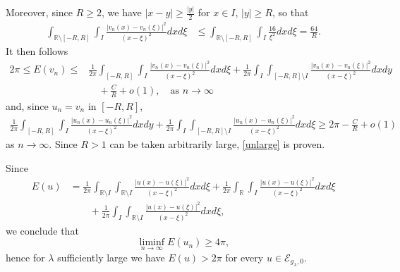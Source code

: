 \documentclass[12pt, a4paper]{article}
\newcommand{\M}[1]{\mathcal{#1}}
\newcommand{\R}{\mathbb{R}}
\newcommand{\blu}[1]{{\color{blue}#1}}
\renewcommand{\(}{\left(}
\renewcommand{\)}{\right)}
\begin{document}
Moreover, since $R\ge 2$, we have $|x-y|\ge \frac{|y|}{2}$ for $x\in I$, $|y|\ge R$, so that
\[\begin{split}
\int_{\R\setminus[-R,R]}\int_{I}\frac{|v_n(x)-v_n(\xi)|^2}{(x-\xi)^2}dxd\xi&\le
\int_{\R\setminus[-R,R]}\int_{I}\frac{16}{\xi^2}dxd\xi= \frac{64}{R}.
\end{split}\]
It then follows
\begin{align*}2\pi \le E(v_n)\le & \frac{1}{2\pi}\int_{[-R,R]}\int_{I}\frac{|v_n(x)-v_n(\xi)|^2}{(x-\xi)^2}dxd\xi+\frac{1}{2\pi}\int_{I}\int_{[-R,R]\setminus I}\frac{|v_n(x)-v_n(\xi)|^2}{(x-\xi)^2}dxdy\\&\quad +\frac{C}{R}+o(1),\quad \text{as }n\to\infty\end{align*}
and, since $u_n=v_n$ in $[-R,R]$,
\[
\begin{split}
\frac{1}{2\pi}\int_{[-R,R]}\int_I\frac{|u_n(x)-u_n(\xi)|^2}{(x-\xi)^2}dxdy+\frac{1}{2\pi}\int_{I}\int_{[-R,R]\setminus I}\frac{|u_n(x)-u_n(\xi)|^2}{(x-\xi)^2}dxd\xi\ge 2\pi-\frac{C}{R}+o(1)
\end{split}
\]
as $n\to\infty$. Since $R>1$ can be taken arbitrarily large, \eqref{unlarge} is proven. 




Since 
\begin{align*}E(u)&=\frac{1}{2\pi}\int_{\R\setminus I}\int_{\R\setminus I}\frac{|u(x)-u(\xi)|^2}{(x-\xi)^2}dxd\xi+\frac{1}{2\pi}\int_{\R}\int_{I}\frac{|u(x)-u(\xi)|^2}{(x-\xi)^2}dxd\xi\\&\qquad +\frac{1}{2\pi}\int_{I}\int_{\R\setminus I}\frac{|u(x)-u(\xi)|^2}{(x-\xi)^2}dxd\xi,\end{align*}
we conclude that
$$\liminf_{n\to\infty}E(u_n) \ge 4\pi,$$
hence for $\lambda$ sufficiently large we have $E(u)>2\pi$ for every $u\in \M{E}_{g_\lambda,0}$.
\end{document}
